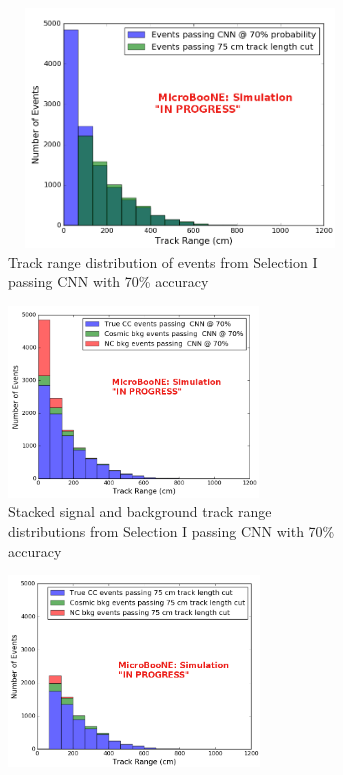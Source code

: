 \begin{figure}[htp!]
\centering
	\begin{subfigure}[b]{.9\textwidth}
	\centering
	\includegraphics[width=4in,height=2.5in]{figs/sel1mod_trackrange_wrongnorm_acc70_0706.png}
	\caption{Track range distribution of events from Selection I passing CNN with 70\% accuracy}
	\label{fig:sel1mod_track}
	\end{subfigure}
	\quad
	\begin{subfigure}[b]{.45\textwidth}
	\includegraphics[width=\textwidth, height=2in]{figs/sel1mod_cnn_stackedevent_0707.png}
	\caption{Stacked signal and background track range distributions from Selection I passing CNN with 70\% accuracy}
	\label{fig:sel1mod_stackedcnn}
	\end{subfigure}
	\quad
	\begin{subfigure}[b]{.45\textwidth}
	\includegraphics[width=\textwidth, height=2in]{figs/sel1mod_original_stackedevents_0707.png}

\end{subfigure}
\end{figure}
